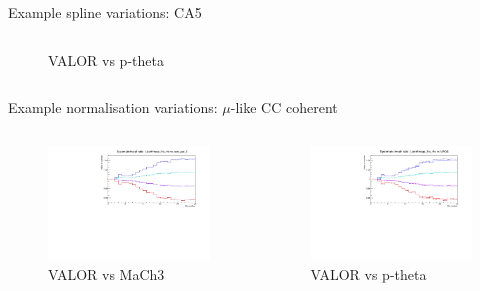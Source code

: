 \documentclass{beamer}
\begin{document}
\begin{frame}{Example spline variations: CA5}
\begin{columns}
\begin{column}{0.5\paperwidth}
\begin{figure}
				\caption{VALOR vs p-theta}
			\end{figure}
		\end{column}
	\end{columns}
\end{frame}

\begin{frame}{Example normalisation variations: $\mu$-like CC coherent}
	\centering
	\begin{columns}
		\begin{column}{0.5\paperwidth}
			\begin{figure}
				\includegraphics[page=17, trim={0cm 0cm 0cm 0cm}, clip, scale=0.35] {images/variations/valor_mach3/variations_prebanff_unosc_1Re}
				\caption{VALOR vs MaCh3}
			\end{figure}
		\end{column}
		\begin{column}{0.5\paperwidth}
			\begin{figure}
				\includegraphics[page=13, trim={0cm 0cm 0cm 0cm}, clip, scale=0.35] {images/variations/valor_ptheta/variations_prebanff_unosc_1Re}
				\caption{VALOR vs p-theta}
			\end{figure}
		\end{column}
	\end{columns}
\end{frame}
\end{document}
